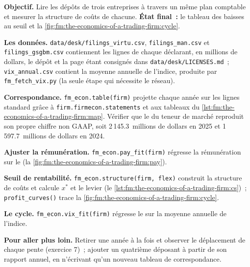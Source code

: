 \begin{tutorial}
\textbf{Objectif.} Lire les dépôts de trois entreprises à travers un même plan comptable et mesurer la structure de coûts de chacune. \textbf{État final~:} le tableau des
baisses au seuil et la \cref{fig:fm:the-economics-of-a-trading-firm:cycle}.
\begin{tutsteps}
\item \textbf{Les données.} \texttt{data/desk/filings\_virtu.csv}, \texttt{filings\_man.csv} et \texttt{filings\_gsgbm.csv} contiennent les lignes de chaque déclarant,
en millions de dollars, le dépôt et la page étant consignés dans \texttt{data/desk/LICENSES.md}~; \texttt{vix\_annual.csv} contient la moyenne annuelle de l'indice,
produite par \texttt{fm\_fetch\_vix.py} (la seule étape qui nécessite le réseau).
\item \textbf{Correspondance.} \texttt{fm\_econ.table(firm)} projette chaque année sur les lignes standard grâce à \texttt{firm.firmecon.statements} et aux tableaux du
\cref{lst:fm:the-economics-of-a-trading-firm:map}. Vérifier que le  du teneur de marché reproduit son propre chiffre non GAAP,
soit 2\,145.3~millions de dollars en 2025 et 1\,597.7~millions de dollars en 2024.
\item \textbf{Ajuster la rémunération.} \texttt{fm\_econ.pay\_fit(firm)} régresse la rémunération sur le  (la \cref{fig:fm:the-economics-of-a-trading-firm:pay}).
\item \textbf{Seuil de rentabilité.} \texttt{fm\_econ.structure(firm, flex)} construit la structure de coûts et calcule $x^\ast$ et le levier
(le \cref{lst:fm:the-economics-of-a-trading-firm:cs})~; \texttt{profit\_curves()} trace la \cref{fig:fm:the-economics-of-a-trading-firm:cycle}.
\label{lst:fm:the-economics-of-a-trading-firm:cs}
\item \textbf{Le cycle.} \texttt{fm\_econ.vix\_fit(firm)} régresse le  sur la moyenne annuelle de l'indice.
\end{tutsteps}
\end{tutorial}

\textbf{Pour aller plus loin.} Retirer une année à la fois et observer le déplacement de chaque pente (exercice 7)~; ajouter un quatrième déposant à partir de son rapport annuel, en
n'écrivant qu'un nouveau tableau de correspondance.

